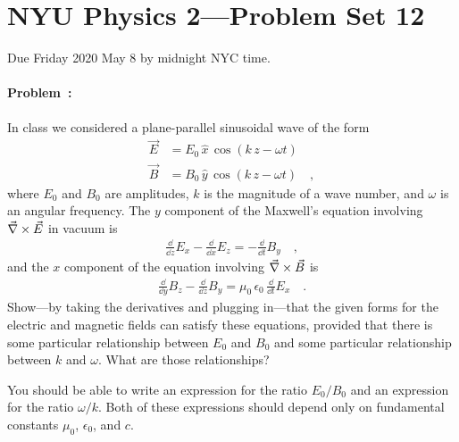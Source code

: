\documentclass[12pt]{article}
\begin{document}
\section*{NYU Physics 2---Problem Set 12}

Due Friday 2020 May 8 by midnight NYC time.

\paragraph{Problem~\theproblem:}\label{prob:wave}%
In class we considered a plane-parallel sinusoidal wave of the form
\begin{align}
  \vec{E} &= E_0\,\hat{x}\,\cos(k\,z - \omega t) \\
  \vec{B} &= B_0\,\hat{y}\,\cos(k\,z - \omega t) \quad ,
\end{align}
where $E_0$ and $B_0$ are amplitudes, $k$ is the magnitude of a
wave number, and $\omega$ is an angular frequency.
The $y$ component of the Maxwell's equation involving
$\vec{\nabla}\times{\vec{E}}$ in vacuum is
\begin{align}
  \frac{\dd}{\dd z}E_x - \frac{\dd}{\dd x}E_z = -\frac{\dd}{\dd t}B_y
  \quad ,
\end{align}
and the $x$ component of the equation involving $\vec{\nabla}\times{\vec{B}}$ is
\begin{align}
  \frac{\dd}{\dd y}B_z - \frac{\dd}{\dd z}B_y = \mu_0\,\epsilon_0\,\frac{\dd}{\dd t}E_x
  \quad .
\end{align}
Show---by taking the derivatives and plugging in---that the given forms
for the electric and magnetic fields can
satisfy these equations, provided that there is some particular relationship
between $E_0$ and $B_0$ and some particular relationship between $k$ and $\omega$.
What are those relationships?

You should be able to write an
expression for the ratio $E_0/B_0$ and an expression for the ratio $\omega/k$.
Both of these expressions should depend only on fundamental constants
$\mu_0$, $\epsilon_0$, and $c$.
\end{document}
